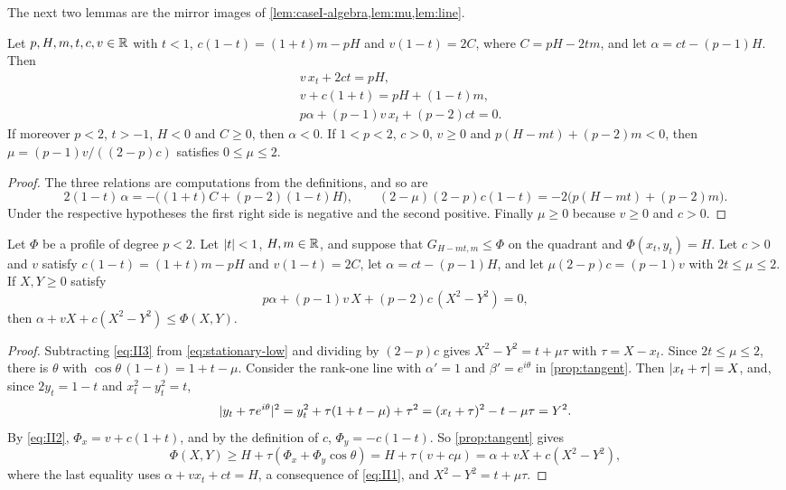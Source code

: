 The next two lemmas are the mirror images of \cref{lem:caseI-algebra,lem:mu,lem:line}.

\begin{lemma}\label{lem:caseII-algebra}
Let $p,H,m,t,c,v\in\mathbb{R}$ with $t<1$, $c(1-t)=(1+t)m-pH$ and $v(1-t)=2C$, where $C=pH-2tm$, and
let $\alpha=ct-(p-1)H$. Then
\begin{align}
  &v\,x_t+2ct=pH,\label{eq:II1}\\
  &v+c(1+t)=pH+(1-t)m,\label{eq:II2}\\
  &p\alpha+(p-1)v\,x_t+(p-2)ct=0.\label{eq:II3}
\end{align}
If moreover $p<2$, $t>-1$, $H<0$ and $C\ge0$, then $\alpha<0$. If $1<p<2$, $c>0$, $v\ge0$ and
$p(H-mt)+(p-2)m<0$, then $\mu=(p-1)v/((2-p)c)$ satisfies $0\le\mu\le2$.
\end{lemma}

\begin{proof}
The three relations are computations from the definitions, and so are
\[
  2(1-t)\,\alpha=-\bigl((1+t)C+(p-2)(1-t)H\bigr),\qquad
  (2-\mu)(2-p)c(1-t)=-2\bigl(p(H-mt)+(p-2)m\bigr).
\]
Under the respective hypotheses the first right side is negative and the second positive.
Finally $\mu\ge0$ because $v\ge0$ and $c>0$.
\end{proof}

\begin{lemma}\label{lem:line-low}
Let $\Phi$ be a profile of degree $p<2$. Let $\lvert t\rvert<1$, $H,m\in\mathbb{R}$, and suppose that
$G_{H-mt,m}\le\Phi$ on the quadrant and $\Phi(x_t,y_t)=H$. Let $c>0$ and $v$ satisfy
$c(1-t)=(1+t)m-pH$ and $v(1-t)=2C$, let $\alpha=ct-(p-1)H$, and let $\mu(2-p)c=(p-1)v$ with
$2t\le\mu\le2$. If $X,Y\ge0$ satisfy
\begin{equation}\label{eq:stationary-low}
  p\alpha+(p-1)v\,X+(p-2)c\,(X^2-Y^2)=0,
\end{equation}
then $\alpha+vX+c(X^2-Y^2)\le\Phi(X,Y)$.
\end{lemma}

\begin{proof}
Subtracting \eqref{eq:II3} from \eqref{eq:stationary-low} and dividing by $(2-p)c$ gives
$X^2-Y^2=t+\mu\tau$ with $\tau=X-x_t$. Since $2t\le\mu\le2$, there is $\theta$ with
$\cos\theta\,(1-t)=1+t-\mu$. Consider the rank-one line with $\alpha'=1$ and
$\beta'=e^{i\theta}$ in \cref{prop:tangent}. Then $\lvert x_t+\tau\rvert=X$, and, since $2y_t=1-t$ and
$x_t^2-y_t^2=t$,
\[
  \lvert y_t+\tau e^{i\theta}\rvert^2=y_t^2+\tau(1+t-\mu)+\tau^2=(x_t+\tau)^2-t-\mu\tau=Y^2 .
\]
By \eqref{eq:II2}, $\Phi_x=v+c(1+t)$, and by the definition of $c$, $\Phi_y=-c(1-t)$. So
\cref{prop:tangent} gives
\[
  \Phi(X,Y)\ge H+\tau(\Phi_x+\Phi_y\cos\theta)=H+\tau(v+c\mu)=\alpha+vX+c(X^2-Y^2),
\]
where the last equality uses $\alpha+vx_t+ct=H$, a consequence of \eqref{eq:II1}, and
$X^2-Y^2=t+\mu\tau$.
\end{proof}


